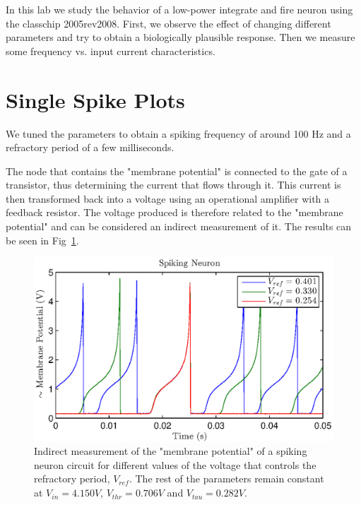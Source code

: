 

\newcommand{\reffig}[1]{Fig.~\ref{#1}}



\newpage

In this lab we study the behavior of a low-power integrate and fire neuron using the classchip 2005rev2008. First, we observe the effect of changing different parameters and try to obtain a biologically plausible response. Then we measure some frequency vs. input current characteristics. \\

\section{Single Spike Plots}

We tuned the parameters to obtain a spiking frequency of around 100 Hz and a refractory period of a few milliseconds. 

The node that contains the "membrane potential" is connected to the gate of a transistor, thus determining the current that flows through it. This current is then transformed back into a voltage using an operational amplifier with a feedback resistor. The voltage produced is therefore related to the "membrane potential" and can be considered an indirect measurement of it. The results can be seen in Fig~\ref{fig:exp1a}. 
\begin{figure}[!h]
    \center
    \includegraphics{exp1a.eps}
    \caption{Indirect measurement of the "membrane potential" of a spiking neuron circuit for different values of the voltage that controls the refractory period, $V_{ref}$. The rest of the parameters remain constant at $V_{in}=4.150 V$, $V_{thr}=0.706 V$ and $V_{tau}=0.282 V$. }
    \label{fig:exp1a}
\end{figure}


